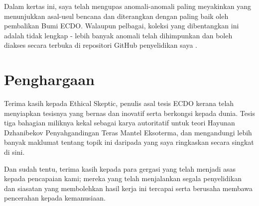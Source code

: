 \documentclass[10pt,twocolumn,letterpaper]{article}
\begin{document}
Dalam kertas ini, saya telah mengupas anomali-anomali paling meyakinkan yang menunjukkan asal-usul bencana dan diterangkan dengan paling baik oleh pembalikan Bumi ECDO. Walaupun pelbagai, koleksi yang dibentangkan ini adalah tidak lengkap - lebih banyak anomali telah dihimpunkan dan boleh diakses secara terbuka di repositori GitHub penyelidikan saya \cite{2}.
\section{Penghargaan}

Terima kasih kepada Ethical Skeptic, penulis asal tesis ECDO kerana telah menyiapkan tesisnya yang bernas dan inovatif serta berkongsi kepada dunia. Tesis tiga bahagian \cite{1} miliknya kekal sebagai karya autoritatif untuk teori Hayunan Dzhanibekov Penyahgandingan Teras Mantel Eksoterma, dan mengandungi lebih banyak maklumat tentang topik ini daripada yang saya ringkaskan secara singkat di sini.

Dan sudah tentu, terima kasih kepada para gergasi yang telah menjadi asas kepada pencapaian kami; mereka yang telah menjalankan segala penyelidikan dan siasatan yang membolehkan hasil kerja ini tercapai serta berusaha membawa pencerahan kepada kemanusiaan.

\clearpage
\twocolumn

{\small
\renewcommand{\refname}{Rujukan}


}
\end{document}
